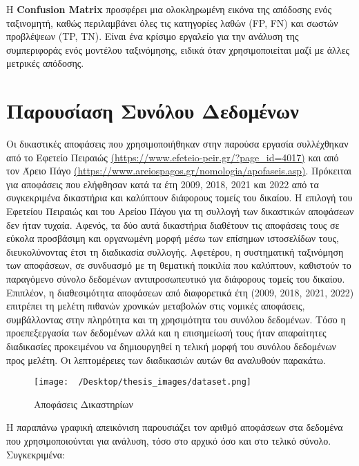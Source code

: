 \documentclass[diploma]{softlab-thesis}
\begin{document}
Η \textbf{Confusion Matrix} προσφέρει μια ολοκληρωμένη εικόνα της απόδοσης ενός ταξινομητή, καθώς περιλαμβάνει όλες τις κατηγορίες λαθών (FP, FN) και σωστών προβλέψεων (TP, TN). Είναι ένα κρίσιμο εργαλείο για την ανάλυση της συμπεριφοράς ενός μοντέλου ταξινόμησης, ειδικά όταν χρησιμοποιείται μαζί με άλλες μετρικές απόδοσης.



\chapter{Παρουσίαση Συνόλου Δεδομένων}

\sloppy
Οι δικαστικές αποφάσεις που χρησιμοποιήθηκαν στην παρούσα εργασία συλλέχθηκαν από το Εφετείο Πειραιώς \href{https://www.efeteio-peir.gr/?page\_id=4017}{(https://www.efeteio-peir.gr/?page\_id=4017)} και από τον Άρειο Πάγο \href{https://www.areiospagos.gr/nomologia/apofaseis.asp}{(https://www.areiospagos.gr/nomologia/apofaseis.asp)}. 
Πρόκειται για αποφάσεις που ελήφθησαν κατά τα έτη 2009, 2018, 2021 και 2022 από τα συγκεκριμένα δικαστήρια και καλύπτουν διάφορους τομείς του δικαίου. 
Η επιλογή του Εφετείου Πειραιώς και του Αρείου Πάγου για τη συλλογή των δικαστικών αποφάσεων δεν ήταν τυχαία. Αφενός, τα δύο αυτά δικαστήρια διαθέτουν τις αποφάσεις τους σε εύκολα προσβάσιμη και οργανωμένη μορφή μέσω των επίσημων ιστοσελίδων τους, διευκολύνοντας έτσι τη διαδικασία συλλογής. Αφετέρου, η συστηματική ταξινόμηση των αποφάσεων, σε συνδυασμό με τη θεματική ποικιλία που καλύπτουν, καθιστούν το παραγόμενο σύνολο δεδομένων αντιπροσωπευτικό για διάφορους τομείς του δικαίου. Επιπλέον, η διαθεσιμότητα αποφάσεων από διαφορετικά έτη (2009, 2018, 2021, 2022) επιτρέπει τη μελέτη πιθανών χρονικών μεταβολών στις νομικές αποφάσεις, συμβάλλοντας στην πληρότητα και τη χρησιμότητα του συνόλου δεδομένων. Τόσο η προεπεξεργασία των δεδομένων αλλά και η επισημείωσή τους ήταν απαραίτητες διαδικασίες προκειμένου να δημιουργηθεί η τελική μορφή του συνόλου δεδομένων προς μελέτη. Οι λεπτομέρειες των διαδικασιών αυτών θα αναλυθούν παρακάτω.

\begin{figure}[h]
    \centering
    \texttt{[image: ~/Desktop/thesis\_images/dataset.png]} %
    \caption{Αποφάσεις Δικαστηρίων}
    \label{fig:your_image_label}
\end{figure}

Η παραπάνω γραφική απεικόνιση παρουσιάζει τον αριθμό αποφάσεων στα δεδομένα που χρησιμοποιούνται για ανάλυση, τόσο στο αρχικό όσο και στο τελικό σύνολο. Συγκεκριμένα:
\end{document}
